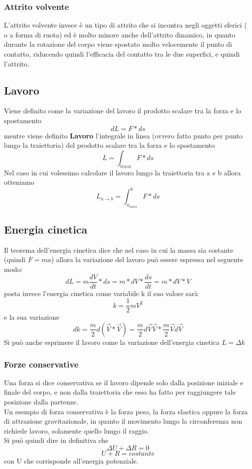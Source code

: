\documentclass[portait]{article}
\begin{document}
\subsubsection{Attrito volvente}
L'attrito volvente invece è un tipo di attrito che si incontra negli oggetti sferici ( o a forma di ruota) ed è molto minore anche dell'attrito dinamico, in quanto durante la rotazione del corpo viene spostato molto velocemente il punto di contatto, riducendo quindi l'efficacia del contatto tra le due superfici, e quindi l'attrito.
\subsection{Lavoro}
Viene definito come la variazione del lavoro il prodotto scalare tra la forza e lo spostamento 
$$dL = F * ds$$
mentre viene definito \textbf{Lavoro} l'integrale in linea (ovvero fatto punto per punto lungo la traiettoria) del prodotto scalare tra la forza e lo spostamento
$$L = \int_{linea}F * ds$$
Nel caso in cui volessimo calcolare il lavoro lungo la traiettoria tra a e b allora otteniamo
$$L_{a \to b} = \int_{a_{linea}}^b F *ds$$
\subsection{Energia cinetica}
Il teorema dell'energia cinetica dice che nel caso in cui la massa sia costante (quindi $F = ma$) allora la variazione del lavoro può essere espressa nel seguente modo:
$$dL = m\frac{dV}{dt}*ds = m*dV*\frac{ds}{dt} = m*dV*V$$
posta invece l'energia cinetica come variabile k il suo valore sarà 
$$k = \frac{1}{2}mV^2$$
e la sua variazione
$$dk= \frac{m}{2}d(\overrightarrow{V} * \overrightarrow{V}) = \frac{m}{2}d\overrightarrow{V}\overrightarrow{V} * \frac{m}{2}\overrightarrow{V}d\overrightarrow{V}$$
Si può anche esprimere il lavoro come la variazione dell'energia cinetica $L = \Delta k$
\subsubsection{Forze conservative}
Una forza si dice conservativa se il lavoro dipende solo dalla posizione iniziale e finale del corpo, e non dalla traiettoria che esso ha fatto per raggiungere tale posizione dalla partenze. \\ 
Un esempio di forza conservativa è la forza peso, la forza elastica oppure la forza di attrazione gravitazionale, in quanto il movimento lungo la circonferenza non richiede lavoro, solamente quello lungo il raggio. \\
Si può quindi dire in definitiva che 
$$\Delta U + \Delta R = 0$$
$$U + R = costante$$
con U che corrisponde all'energia potenziale.
\end{document}
